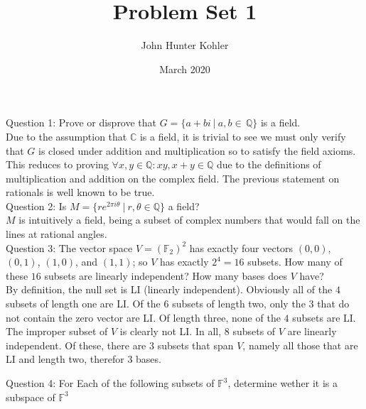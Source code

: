 \documentclass[11pt]{article}
\title{Problem Set 1}
\author{John Hunter Kohler}
\date{March 2020}
\begin{document}
	\noindent Question 1: Prove or disprove that $G=\{a+bi \:| \: a,b\in \, \mathbb{Q}\}$ is a field.\\

	Due to the assumption that $\mathbb{C}$ is a field, it is trivial to see we must only verify that $G$ 
	is closed under addition and multiplication so to satisfy the field axioms. This reduces to proving
	$\forall x,y\in\mathbb{Q}:xy,x + y\in\mathbb{Q}$ due to the definitions of multiplication and addition 
	on the complex field. The previous statement on rationals is well known to be true.\\

	\noindent Question 2: Is $M=\{re^{2\pi i\theta}\:|\:r,\theta\in\mathbb{Q}\}$ a field?\\

	$M$ is intuitively a field, being a subset of complex numbers that would fall on the lines at rational
	angles.\\

	\noindent Question 3: The vector space $V=(\mathbb{F}_2)^2$ has exactly four vectors $(0, 0)$, $(0, 1)$,
						  $(1, 0)$, and $(1, 1)$; so $V$ has exactly $2^4 = 16$ subsets. How many of these $16$ subsets
						  are linearly independent? How many bases does $V$ have?\\

	By definition, the null set is LI (linearly independent). Obviously all of the $4$ subsets of length one are LI. Of the
	$6$ subsets of length two, only the $3$ that do not contain the zero vector are LI. 
	Of length three, none of the $4$ subsets are LI. The improper subset of $V$ is clearly not LI. 
	In all, $8$ subsets of $V$ are linearly independent. Of these, there are $3$ subsets that span $V$, namely all those
	that are LI and length two, therefor $3$ bases.


	\noindent Question 4: For Each of the following subsets of $\mathbb{F}^3$, determine wether it is a subspace of $\mathbb{F}^3$
\end{document}
